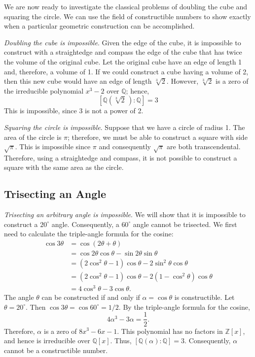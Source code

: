 We are now ready to investigate the classical problems of doubling
the cube and squaring the circle.  We can use the field of
constructible numbers to show exactly when a particular geometric
construction can be accomplished.    

 
{\em Doubling the cube is impossible}.  Given the
edge of the cube, it is impossible to construct with a straightedge
and compass the edge of the cube that has twice the volume of the
original cube. Let the original cube have an edge of length 1 and,
therefore, a volume of  1. If we could construct a cube having a
volume of 2, then this new cube would have an edge of length
$\sqrt[3]{2}$. However, $\sqrt[3]{2}$ is a zero of the irreducible
polynomial $x^3 -2$ over ${\mathbb Q}$; hence, 
\[
[{\mathbb Q}(\sqrt[3]{2}\, ) : {\mathbb Q}] =3
\]
This is impossible, since 3 is not a power of 2.
 
 
{\em Squaring the circle is impossible}.
Suppose that we have a circle of radius 1.  The area of the circle 
is $\pi$; therefore, we must be able to construct a square with side
$\sqrt{\pi}$. This is impossible since $\pi$ and consequently
$\sqrt{\pi}$ are both transcendental. Therefore, using a straightedge
and compass, it is not possible to construct a square with the same
area as the circle.  
 


\subsection*{Trisecting an Angle}
 

{\em Trisecting an arbitrary angle is impossible}.  We will show that
it is impossible to construct a $20^\circ$ angle.  Consequently, a
$60^{\circ}$ angle cannot be trisected. We first need to calculate
the triple-angle formula for the cosine: 
\begin{align*}
\cos 3 \theta & = \cos( 2 \theta + \theta ) \\
& =
\cos 2 \theta \cos \theta - \sin 2 \theta \sin \theta \\
& =
( 2 \cos^2 \theta - 1) \cos \theta - 2 \sin^2 \theta \cos
\theta \\
& =
( 2 \cos^2 \theta - 1) \cos \theta - 2 (1- \cos^2 \theta)
\cos \theta \\
& =
4 \cos^3 \theta - 3 \cos \theta.
\end{align*}
The angle $\theta$ can be constructed if and only if $\alpha = \cos
\theta$ is constructible. Let $\theta = 20^{\circ}$. Then $\cos 3
\theta =  \cos 60^\circ = 1/2$. By the triple-angle formula for the
cosine,
\[
4 \alpha^3 - 3 \alpha = \frac{1}{2}.
\]
Therefore, $\alpha$ is a zero of $8 x^3 - 6 x -1$.  This polynomial
has no factors in ${\mathbb Z}[x]$, and hence is irreducible over ${\mathbb
Q}[x]$. Thus, $[{\mathbb Q}( \alpha ) : {\mathbb Q }] = 3$. Consequently,
$\alpha$ cannot be a constructible number.
 
